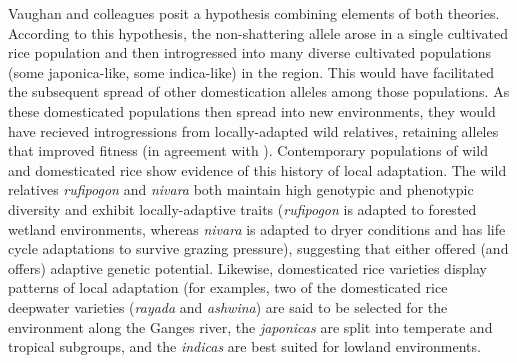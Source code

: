 \documentclass[11pt]{article}
\begin{document}
\begin{enumerate}

Vaughan and colleagues \cite{vaughan2008evolving} posit a hypothesis combining elements of both theories.
According to this hypothesis, the non-shattering allele arose in a single cultivated rice population and then introgressed into many diverse cultivated populations (some japonica-like, some indica-like) in the region.
This would have facilitated the subsequent spread of other domestication alleles among those populations.
As these domesticated populations then spread into new environments, they would have recieved introgressions from locally-adapted wild relatives, retaining alleles that improved fitness (in agreement with \cite{second1982origin}).
Contemporary populations of wild and domesticated rice show evidence of this history of local adaptation.
The wild relatives \emph{rufipogon} and \emph{nivara} both maintain high genotypic and phenotypic diversity and exhibit locally-adaptive traits (\emph{rufipogon} is adapted to forested wetland environments, whereas \emph{nivara} is adapted to dryer conditions and has life cycle adaptations to survive grazing pressure), suggesting that either offered (and offers) adaptive genetic potential.
Likewise, domesticated rice varieties display patterns of local adaptation (for examples, two of the domesticated rice deepwater varieties (\emph{rayada} and \emph{ashwina}) are said to be selected for the environment along the Ganges river, the \emph{japonicas} are split into temperate and tropical subgroups, and the \emph{indicas} are best suited for lowland environments.









\end{enumerate}
\end{document}

